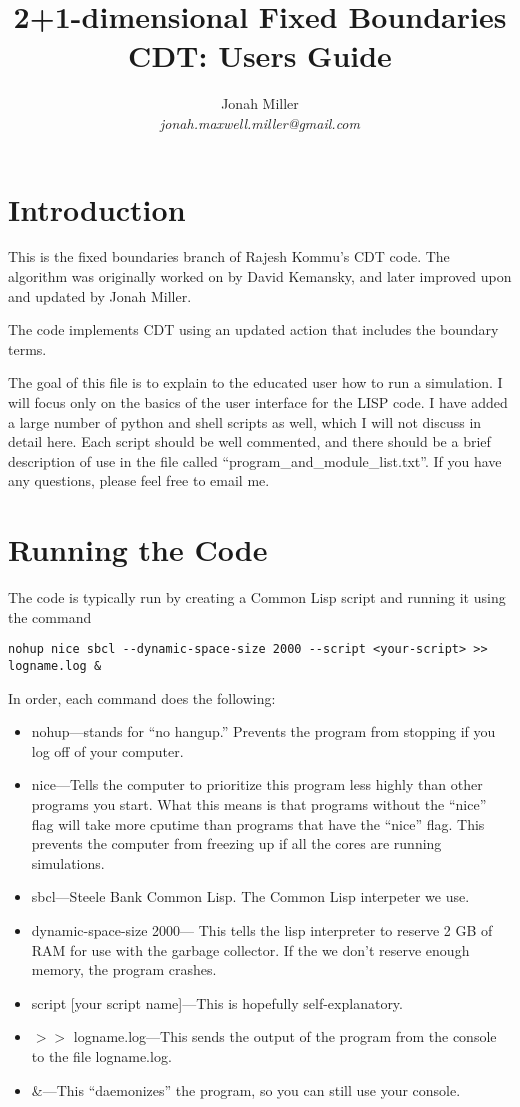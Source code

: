 \documentclass{article}
\author{Jonah Miller\\
\textit{jonah.maxwell.miller@gmail.com}}
\title{2+1-dimensional Fixed Boundaries CDT: Users Guide}
\begin{document}
\maketitle

\section{Introduction}

This is the fixed boundaries branch of Rajesh Kommu's CDT code. The
algorithm was originally worked on by David Kemansky, and later
improved upon and updated by Jonah Miller.

The code implements CDT using an updated action that includes the
boundary terms.

The goal of this file is to explain to the educated user how to run a
simulation. I will focus only on the basics of the user interface for
the LISP code. I have added a large number of python and shell scripts
as well, which I will not discuss in detail here. Each script should
be well commented, and there should be a brief description of use in
the file called ``program\_and\_module\_list.txt''. If you have any
questions, please feel free to email me.

\section{Running the Code}

The code is typically run by creating a Common Lisp script and running
it using the command

\lstset{language=Bash,stepnumber=2}
\begin{lstlisting}
nohup nice sbcl --dynamic-space-size 2000 --script <your-script> >> logname.log &
\end{lstlisting}
In order, each command does the following:
\begin{itemize}
\item nohup---stands for ``no hangup.'' Prevents the program from
  stopping if you log off of your computer.
\item nice---Tells the computer to prioritize this program less highly
  than other programs you start. What this means is that programs
  without the ``nice'' flag will take more cputime than programs that
  have the ``nice'' flag. This prevents the computer from freezing up
  if all the cores are running simulations.
\item sbcl---Steele Bank Common Lisp. The Common Lisp interpeter we use.
\item dynamic-space-size 2000--- This tells the lisp interpreter to
  reserve 2 GB of RAM for use with the garbage collector. If the we
  don't reserve enough memory, the program crashes.
\item script [your script name]---This is hopefully self-explanatory.
\item $>>$ logname.log---This sends the
  output of the program from the console to the file logname.log.
\item \&---This ``daemonizes'' the program, so you can still use your console.
\end{itemize}
\end{document}
